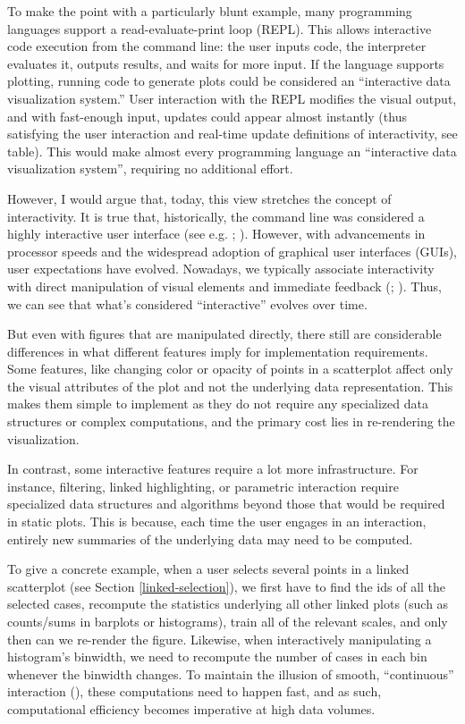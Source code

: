 \documentclass[
]{book}
\theoremstyle{definition}
\theoremstyle{definition}
\theoremstyle{definition}
\theoremstyle{definition}
\theoremstyle{remark}
\begin{document}
To make the point with a particularly blunt example, many programming languages support a read-evaluate-print loop (REPL). This allows interactive code execution from the command line: the user inputs code, the interpreter evaluates it, outputs results, and waits for more input. If the language supports plotting, running code to generate plots could be considered an ``interactive data visualization system.'' User interaction with the REPL modifies the visual output, and with fast-enough input, updates could appear almost instantly (thus satisfying the user interaction and real-time update definitions of interactivity, see table). This would make almost every programming language an ``interactive data visualization system'', requiring no additional effort.

However, I would argue that, today, this view stretches the concept of interactivity. It is true that, historically, the command line was considered a highly interactive user interface (see e.g. ; ). However, with advancements in processor speeds and the widespread adoption of graphical user interfaces (GUIs), user expectations have evolved. Nowadays, we typically associate interactivity with direct manipulation of visual elements and immediate feedback (; ). Thus, we can see that what's considered ``interactive'' evolves over time.

But even with figures that are manipulated directly, there still are considerable differences in what different features imply for implementation requirements. Some features, like changing color or opacity of points in a scatterplot affect only the visual attributes of the plot and not the underlying data representation. This makes them simple to implement as they do not require any specialized data structures or complex computations, and the primary cost lies in re-rendering the visualization.

In contrast, some interactive features require a lot more infrastructure. For instance, filtering, linked highlighting, or parametric interaction require specialized data structures and algorithms beyond those that would be required in static plots. This is because, each time the user engages in an interaction, entirely new summaries of the underlying data may need to be computed.

To give a concrete example, when a user selects several points in a linked scatterplot (see Section \ref{linked-selection}), we first have to find the ids of all the selected cases, recompute the statistics underlying all other linked plots (such as counts/sums in barplots or histograms), train all of the relevant scales, and only then can we re-render the figure. Likewise, when interactively manipulating a histogram's binwidth, we need to recompute the number of cases in each bin whenever the binwidth changes. To maintain the illusion of smooth, ``continuous'' interaction (), these computations need to happen fast, and as such, computational efficiency becomes imperative at high data volumes.
\end{document}
